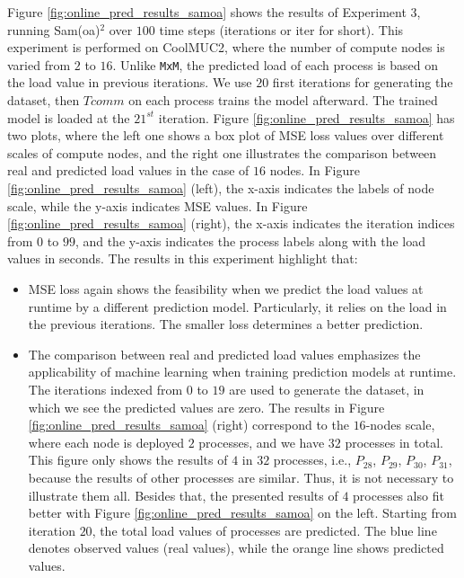 Figure \ref{fig:online_pred_results_samoa} shows the results of Experiment 3, running Sam(oa)$^2$ over $100$ time steps (iterations or iter for short). This experiment is performed on CoolMUC2, where the number of compute nodes is varied from $2$ to $16$. Unlike \texttt{MxM}, the predicted load of each process is based on the load value in previous iterations. We use $20$ first iterations for generating the dataset, then $Tcomm$ on each process trains the model afterward. The trained model is loaded at the $21^{st}$ iteration. Figure \ref{fig:online_pred_results_samoa} has two plots, where the left one shows a box plot of MSE loss values over different scales of compute nodes, and the right one illustrates the comparison between real and predicted load values in the case of $16$ nodes. In Figure \ref{fig:online_pred_results_samoa} (left), the x-axis indicates the labels of node scale, while the y-axis indicates MSE values. In Figure \ref{fig:online_pred_results_samoa} (right), the x-axis indicates the iteration indices from $0$ to $99$, and the y-axis indicates the process labels along with the load values in seconds. The results in this experiment highlight that:
\begin{itemize}
	\item MSE loss again shows the feasibility when we predict the load values at runtime by a different prediction model. Particularly, it relies on the load in the previous iterations. The smaller loss determines a better prediction.
	\item The comparison between real and predicted load values emphasizes the applicability of machine learning when training prediction models at runtime. The iterations indexed from $0$ to $19$ are used to generate the dataset, in which we see the predicted values are zero. The results in Figure \ref{fig:online_pred_results_samoa} (right) correspond to the $16$-nodes scale, where each node is deployed $2$ processes, and we have $32$ processes in total. This figure only shows the results of $4$ in $32$ processes, i.e., $P_{28}$,  $P_{29}$,  $P_{30}$,  $P_{31}$, because the results of other processes are similar. Thus, it is not necessary to illustrate them all. Besides that, the presented results of $4$ processes also fit better with Figure \ref{fig:online_pred_results_samoa} on the left. Starting from iteration $20$, the total load values of processes are predicted. The blue line denotes observed values (real values), while the orange line shows predicted values.
\end{itemize}

